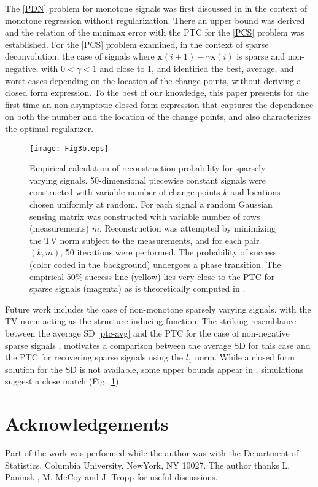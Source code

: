 \documentclass[11pt]{article}
\begin{document}
The \eqref{PDN} problem for monotone signals was first discussed in \cite{DJM13} in the context of monotone regression without regularization. There an upper bound was derived and the relation of the minimax error with the PTC for the \eqref{PCS} problem was established. For the \ref{PCS} problem \cite{PP13a} examined, in the context of sparse deconvolution, the case of signals where $\bm{x}(i+1) - \gamma\bm{x}(i)$ is sparse and non-negative, with $0<\gamma<1$ and close to 1, and identified the best, average, and worst cases depending on the location of the change points, without deriving a closed form expression. To the best of our knowledge, this paper presents for the first time an non-asymptotic closed form expression that captures the dependence on both the number and the location of the change points, and also characterizes the optimal regularizer.
\begin{figure}[t]
	\centering
	\texttt{[image: Fig3b.eps]}
	\caption{Empirical calculation of reconstruction probability for sparsely varying signals. 50-dimensional piecewise constant signals were constructed with variable number of change points $k$ and locations chosen uniformly at random. For each signal a random Gaussian sensing matrix was constructed with variable number of rows (measurements) $m$. Reconstruction was attempted by minimizing the TV norm subject to the measurements, and for each pair $(k,m)$, 50 iterations were performed. The probability of success (color coded in the background) undergoes a phase transition. The empirical $50\%$ success line (yellow) lies very close to the PTC for sparse signals (magenta) as is theoretically computed in \cite{DMM09}.
	}
	\label{PTC-TV}
\end{figure}
\noindent Future work includes the case of non-monotone sparsely varying signals, with the TV norm acting as the structure inducing function. The striking resemblance between the average SD \eqref{ptc-avg} and the PTC for the case of non-negative sparse signals \citep{DMM09}, motivates a comparison between the average SD for this case and the PTC for recovering sparse signals using the $l_1$ norm. While a closed form solution for the SD is not available, some upper bounds appear in \cite{CX15}, simulations suggest a close match (Fig.~\ref{PTC-TV}).



\section{Acknowledgements}
Part of the work was performed while the author was with the Department of Statistics, Columbia University, NewYork, NY 10027. The author thanks L. Paninski, M. McCoy and J. Tropp for useful discussions.
\end{document}
